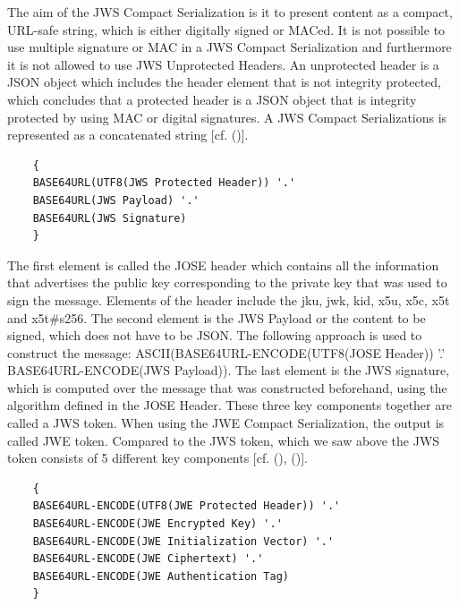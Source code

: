 {{	The aim of the JWS Compact Serialization is it to present content as a compact, URL-safe string, which is either digitally signed or MACed. It is not possible to use multiple signature or MAC in a JWS Compact Serialization and furthermore it is not allowed to use JWS Unprotected Headers. An unprotected header is a JSON object which includes the header element that is not integrity protected, which concludes that a protected header is a JSON object that is integrity protected by using MAC or digital signatures. A JWS Compact Serializations is represented as a concatenated string [cf. (\cite{JWS:IETF:Jones:2015})].
	
	\begin{lstlisting}
	{
	BASE64URL(UTF8(JWS Protected Header)) '.'
	BASE64URL(JWS Payload) '.'
	BASE64URL(JWS Signature)
	}
	\end{lstlisting}
	
	The first element is called the JOSE header which contains all the information that advertises the public key corresponding to the private key that was used to sign the message. Elements of the header include the jku, jwk, kid, x5u, x5c, x5t and x5t\#s256. The second element is the JWS Payload or the content to be signed, which does not have to be JSON. The following approach is used to construct the message: ASCII(BASE64URL-ENCODE(UTF8(JOSE Header)) '.' BASE64URL-ENCODE(JWS Payload)). 
	The last element is the JWS signature, which is computed over the message that was constructed beforehand, using the algorithm defined in the JOSE Header. These three key components together are called a JWS token. When using the JWE Compact Serialization, the output is called JWE token. Compared to the JWS token, which we saw above the JWS token consists of 5 different key components [cf. (\cite{JWS:IETF:Jones:2015}), (\cite{JWE:IETF:Jones:2015})].
	
	
	\begin{lstlisting}
	{
	BASE64URL-ENCODE(UTF8(JWE Protected Header)) '.'
	BASE64URL-ENCODE(JWE Encrypted Key) '.'
	BASE64URL-ENCODE(JWE Initialization Vector) '.'
	BASE64URL-ENCODE(JWE Ciphertext) '.'
	BASE64URL-ENCODE(JWE Authentication Tag)
	}
	\end{lstlisting}
	
}}
